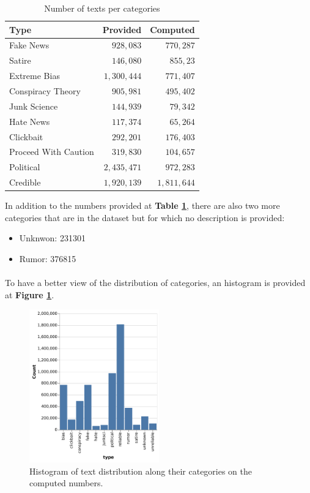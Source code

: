 \begin{table}[h]
\centering
	\begin{tabular}{l|r|r}
  Type & Provided & Computed\\
  \hline
  Fake News & $928,083$ & $770,287$\\
  Satire & $146,080$ & $855,23$\\
  Extreme Bias & $1,300,444$ & $771,407$\\
  Conspiracy Theory & $905,981$ & $495,402$\\
  Junk Science & $144,939$ & $79,342$\\
  Hate News & $117,374$ & $65,264$\\
  Clickbait & $292,201$ & $176,403$\\
  Proceed With Caution & $319,830$ & $104,657$\\
  Political & $2,435,471$ & $972,283$\\
  Credible & $1,920,139$ & $1,811,644$\\
  \hline
\end{tabular}
  \caption{Number of texts per categories}
  \label{tab:explo:count1}
\end{table}

In addition to the numbers provided at \textbf{Table \ref{tab:explo:count1}}, there are also two more categories that are in the dataset but for which no description is provided: 
\begin{itemize}
  \item Unknwon: 231301
  \item Rumor: 376815
\end{itemize}

\paragraph{} To have a better view of the distribution of categories, an histogram is provided at \textbf{Figure \ref{fig:chap1:hist1}}.

\begin{figure}[!ht]
	\centering
	\includegraphics[width=0.5\textwidth]{images/data_exploration/plot1}
	\caption{Histogram of text distribution along their categories on the computed numbers. }
	\label{fig:chap1:hist1}
\end{figure}

